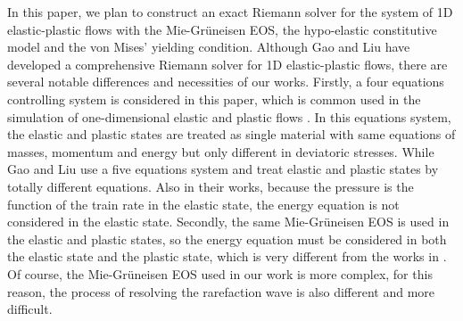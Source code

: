 \documentclass{article}
\numberwithin{equation}{section}
\numberwithin{table}{section}
\begin{document}
In this paper, we  plan to construct an exact Riemann solver for the system of 1D elastic-plastic flows with the Mie-Gr\"uneisen EOS, the hypo-elastic constitutive model and the von Mises' yielding condition. Although Gao and Liu \cite{gao20171d,gao2018complete} have developed a comprehensive Riemann solver for 1D elastic-plastic flows, there are several notable differences and necessities of our works.
Firstly,  a four equations controlling system is considered in this paper, which is common used in the simulation of one-dimensional elastic and plastic flows \cite{ortega2014numerical,favrie2011dynamics}. In this equations system, the elastic and plastic states are treated as single material with same equations of masses, momentum and energy but only different in deviatoric stresses. While Gao and Liu \cite{gao20171d,gao2018complete} use a five equations system and treat elastic and plastic states by totally different equations. Also  in their works, because the pressure is the function of the train rate in the elastic state, the energy equation is not considered in the elastic state. Secondly, the same Mie-Gr\"uneisen EOS is used in the elastic and plastic states, so the energy equation must be considered in both the elastic state and the plastic state, which is  very different from the works in \cite{gao20171d,gao2018complete}. Of course, the Mie-Gr\"uneisen EOS used in our work is more complex, for this reason, the process of resolving the rarefaction wave is also different and more difficult.
 
 
\end{document}
